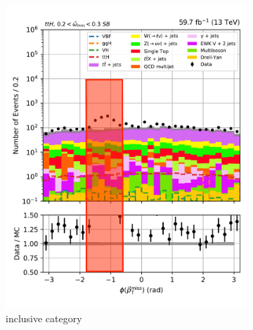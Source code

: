\begin{figure}[htbp]
    \centering
    \begin{subfigure}[b]{0.34\textwidth}
        \includegraphics[width=\textwidth]{figures/hem_issue/sideband_4/met_phi/met_phi_ttH_before_annotated.pdf}
        \caption{\ttH inclusive category}
    \end{subfigure}
    \hspace{0.05\textwidth}
    \begin{subfigure}[b]{0.34\textwidth}

\end{subfigure}
\end{figure}
